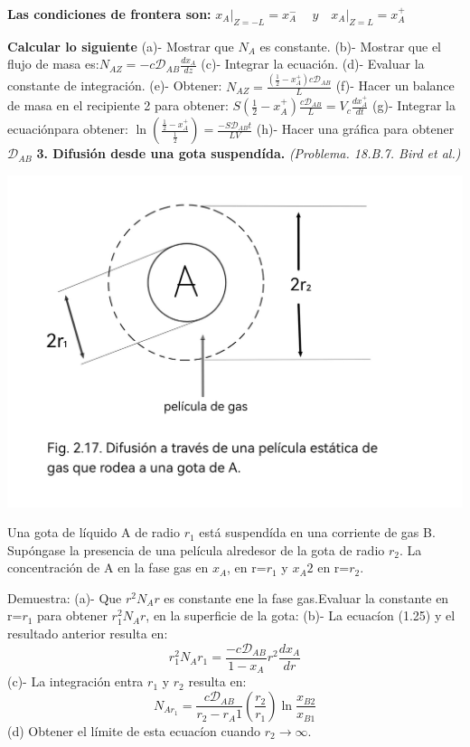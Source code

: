\textbf{Las condiciones de frontera son:} \quad
$
x_A \bigg|_{Z=-L}= x_A^- \quad \ y \quad x_A \bigg|_{Z=L}= x_A^+ \quad
$

\textbf{Calcular lo siguiente}
\flushleft
(a)- Mostrar que $N_A$ es constante.
\flushleft
(b)- Mostrar que el flujo de masa es:\quad $ N_{A Z}= - c \mathscr{D}_{AB} \frac{dx_A}{dz} $
\flushleft
(c)- Integrar la ecuación.
\flushleft
(d)- Evaluar la constante de integración.
\flushleft
(e)- Obtener:\quad 
$ N_{AZ} = \frac{(\frac{1}{2}-x_A^+)c\mathscr{D}_{AB}} {L}$
\flushleft
(f)- Hacer un balance de masa en el recipiente 2 para obtener:\quad 
   $ S(\frac{1}{2}-x_A^+)\frac{c\mathscr{D}_{AB}} {L} = V_c 
   \frac{dx_A^+}{dt} $
\flushleft
(g)- Integrar la ecuaciónpara obtener: \quad
$
\ln (\frac{\frac{1}{2}-x_A^+}{\frac{1}{2}})=\frac{-S\mathscr{D}_{AB}t}{LV}
$
\flushleft
(h)- Hacer una gráfica para obtener $\mathscr{D}_{AB}$ 
\vspace{0.2cm}
\newpage
\textbf{3. Difusión desde una gota suspendída.} \textit{(Problema. 18.B.7. Bird et al.)}
\flushleft
\begin{minipage}{0.45\textwidth} %
    \includegraphics[width=\linewidth]{./Capitulo2/Imagenes/imagen-6.jpg} %
\end{minipage}
\hfill %
\begin{minipage}{0.5\textwidth} %
Una gota de líquido A de radio $r_1$ está suspendída en una corriente de gas B. Supóngase la presencia de una película alredesor de la gota de radio $r_2$. La concentración de A en la fase gas en $x_A$, en r=$r_1$ y $x_A2$ en r=$r_2$.
\end{minipage}
Demuestra:
\flushleft
(a)- Que $r^{2}N_Ar$ es constante ene la fase gas.Evaluar la constante en r=$r_1$ para obtener $r^{2}_1N_Ar$, en la superficie de la gota:
\flushleft
(b)- La ecuacíon (1.25) y el resultado anterior resulta en: \[r^{2}_1N_Ar_1=\frac{-c\mathscr{D}_{AB}}{1-x_A}r^{2}\frac{dx_A}{dr}\]
(c)- La integración entra $r_1$ y $r_2$ resulta en:
\[ N_{Ar_1}=\frac{c\mathscr{D}_{AB}}{r_2-r_A1}(\frac{r_2}{r_1}){\ln {\frac{x_{B2}}{x_{B1}}}}\]
(d) Obtener el límite de esta ecuacíon cuando $r_2\rightarrow \infty$.
\newpage
